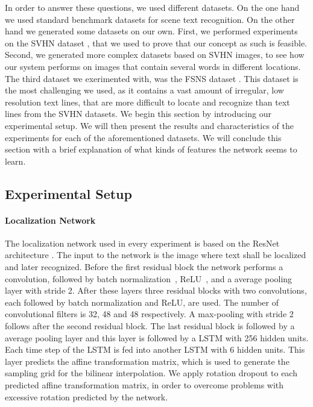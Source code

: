 \documentclass[letterpaper]{article}
\begin{document}
	In order to answer these questions, we used different datasets.
	On the one hand we used standard benchmark datasets for scene text recognition.
	On the other hand we generated some datasets on our own.
	First, we performed experiments on the SVHN dataset \cite{Netzer2011Reading}, that we used to prove that our concept as such is feasible.
	Second, we generated more complex datasets based on SVHN images, to see how our system performs on images that contain several words in different locations.
	The third dataset we exerimented with, was the \acf{FSNS} dataset \cite{Smith2016EndToEnd}.
	This dataset is the most challenging we used, as it contains a vast amount of irregular, low resolution text lines, that are more difficult to locate and recognize than text lines from the SVHN datasets.
	We begin this section by introducing our experimental setup.
	We will then present the results and characteristics of the experiments for each of the aforementioned datasets.
	We will conclude this section with a brief explanation of what kinds of features the network seems to learn.

	\subsection{Experimental Setup}
	\label{ssec:experimental_setup}

	\paragraph{Localization Network}
	The localization network used in every experiment is based on the ResNet architecture \cite{He2016Deep}.
	The input to the network is the image where text shall be localized and later recognized.
	Before the first residual block the network performs a  convolution, followed by batch normalization~\cite{Ioffe2015Batcha}, ReLU~\cite{Nair2010Rectified}, and a  average pooling layer with stride 2.
	After these layers three residual blocks with two  convolutions, each followed by batch normalization and ReLU, are used.
	The number of convolutional filters is 32, 48 and 48 respectively.
	A  max-pooling with stride 2 follows after the second residual block.
	The last residual block is followed by a  average pooling layer and this layer is followed by a \ac{LSTM} with 256 hidden units.
	Each time step of the \ac{LSTM} is fed into another \ac{LSTM} with 6 hidden units.
	This layer predicts the affine transformation matrix, which is used to generate the sampling grid for the bilinear interpolation.
	We apply rotation dropout to each predicted affine transformation matrix, in order to overcome problems with excessive rotation predicted by the network.
\end{document}
